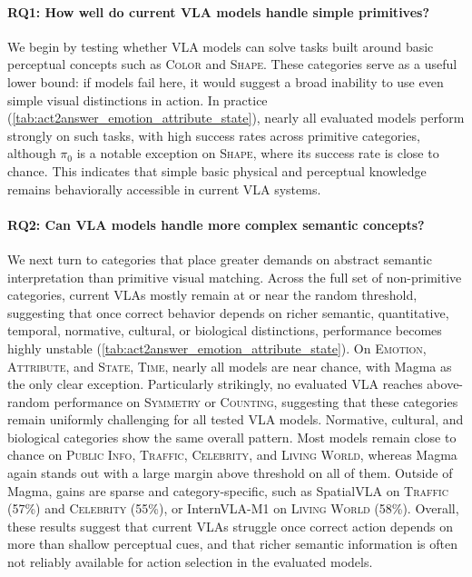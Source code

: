 \documentclass[11pt]{article}
\begin{document}
\paragraph{RQ1: How well do current VLA models handle simple primitives?}
We begin by testing whether VLA models can solve tasks built around basic perceptual concepts such as \textsc{Color} and \textsc{Shape}. These categories serve as a useful lower bound: if models fail here, it would suggest a broad inability to use even simple visual distinctions in action. In practice (\autoref{tab:act2answer_emotion_attribute_state}), nearly all evaluated models perform strongly on such tasks, with high success rates across primitive categories, although $\pi_0$ is a notable exception on \textsc{Shape}, where its success rate is close to chance. This indicates that simple basic physical and perceptual knowledge remains behaviorally accessible in current VLA systems.

\paragraph{RQ2: Can VLA models handle more complex semantic concepts?}
We next turn to categories that place greater demands on abstract semantic interpretation than primitive visual matching. Across the full set of non-primitive categories, current VLAs mostly remain at or near the random threshold, suggesting that once correct behavior depends on richer semantic, quantitative, temporal, normative, cultural, or biological distinctions, performance becomes highly unstable (\autoref{tab:act2answer_emotion_attribute_state}). On \textsc{Emotion}, \textsc{Attribute}, and \textsc{State}, \textsc{Time}, nearly all models are near chance, with Magma as the only clear exception. Particularly strikingly, no evaluated VLA reaches above-random performance on \textsc{Symmetry} or \textsc{Counting}, suggesting that these categories remain uniformly challenging for all tested VLA models. Normative, cultural, and biological categories show the same overall pattern. Most models remain close to chance on \textsc{Public Info}, \textsc{Traffic}, \textsc{Celebrity}, and \textsc{Living World}, whereas Magma again stands out with a large margin above threshold on all of them. Outside of Magma, gains are sparse and category-specific, such as SpatialVLA on \textsc{Traffic} (57\%) and \textsc{Celebrity} (55\%), or InternVLA-M1 on \textsc{Living World} (58\%). Overall, these results suggest that current VLAs struggle once correct action depends on more than shallow perceptual cues, and that richer semantic information is often not reliably available for action selection in the evaluated models.
\end{document}
